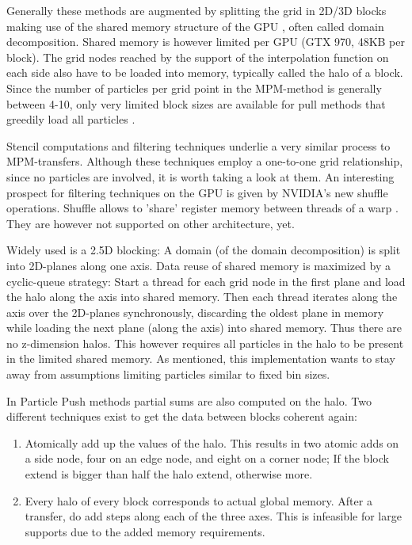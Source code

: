 \documentclass[m,times]{cgMA}
\begin{document}
Generally these methods are augmented by splitting the grid in 2D/3D blocks making use of the shared memory structure of the GPU \cite{PIC:GPU} \cite{honig2010generic} \cite{MPM:GPU}, often called domain decomposition. Shared memory is however limited per GPU (GTX 970, 48KB per block). The grid nodes reached by the support of the interpolation function on each side also have to be loaded into memory, typically called the halo of a block. Since the number of particles per grid point in the MPM-method is generally between 4-10, only very limited block sizes are available for pull methods that greedily load all particles \cite{MPM:SNOW}.

Stencil computations and filtering techniques underlie a very similar process to MPM-transfers. Although these techniques employ a one-to-one grid relationship, since no particles are involved, it is worth taking a look at them.
An interesting prospect for filtering techniques on the GPU is given by NVI\-DIA's new shuffle operations. Shuffle allows to 'share' register memory between threads of a warp \cite{NVIDIA:SHUFFLE}. They are however not supported on other architecture, yet.

Widely used is a 2.5D blocking: A domain (of the domain decomposition) is split into 2D-planes along one axis. Data reuse of shared memory is maximized by a cyclic-queue strategy: Start a thread for each grid node in the first plane and load the halo along the axis into shared memory. Then each thread iterates along the axis over the 2D-planes synchronously, discarding the oldest plane in memory while loading the next plane (along the axis) into shared memory. Thus there are no z-dimension halos. This however requires all particles in the halo to be present in the limited shared memory. As mentioned, this implementation wants to stay away from assumptions limiting particles similar to fixed bin sizes. \cite{brandvik2010sblock} \cite{williams2007scientific} \cite{krotkiewski2013efficient}

In Particle Push methods partial sums are also computed on the halo. Two different techniques exist to get the data between blocks coherent again:
\begin{enumerate}
\item Atomically add up the values of the halo. This results in two atomic adds on a side node, four on an edge node, and eight on a corner node; If the block extend is bigger than half the halo extend, otherwise more.
\item Every halo of every block corresponds to actual global memory. After a transfer, do add steps along each of the three axes. This is infeasible for large supports due to the added memory requirements. \cite{crassin2011interactive}
\end{enumerate}
\end{document}
